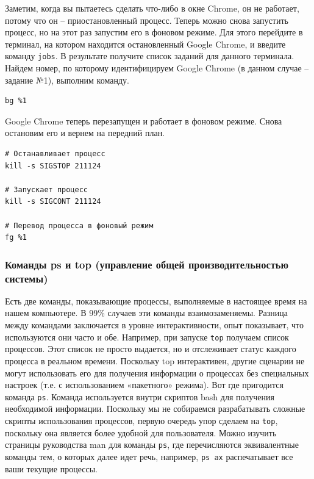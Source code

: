 \documentclass[12pt]{article}
\begin{document}
Заметим, когда вы пытаетесь сделать что-либо в окне Chrome, он не
работает, потому что он -- приостановленный процесс. Теперь можно снова
запустить процесс, но на этот раз запустим его в фоновом режиме. Для
этого перейдите в терминал, на котором находится остановленный Google
Chrome, и введите команду \texttt{jobs}. В результате получите список
заданий для данного терминала. Найдем номер, по которому идентифицируем
Google Chrome (в данном случае -- задание №1), выполним команду.

\begin{verbatim}
bg %1
\end{verbatim}

Google Chrome теперь перезапущен и работает в фоновом режиме. Снова
остановим его и вернем на передний план.

\begin{verbatim}
# Останавливает процесс
kill -s SIGSTOP 211124

# Запускает процесс
kill -s SIGCONT 211124

# Перевод процесса в фоновый режим
fg %1
\end{verbatim}

\hypertarget{ps-and-top-commands-system-performance-management}{%
\subsubsection{\texorpdfstring{\protect\hyperlink{ps-and-top-commands-system-performance-management}{}Команды
ps и top (управление общей производительностью
системы)}{Команды ps и top (управление общей производительностью системы)}}\label{ps-and-top-commands-system-performance-management}}

Есть две команды, показывающие процессы, выполняемые в настоящее время
на нашем компьютере. В 99\% случаев эти команды взаимозаменяемы. Разница
между командами заключается в уровне интерактивности, опыт показывает,
что используются они часто и обе. Например, при запуске \texttt{top}
получаем список процессов. Этот список не просто выдается, но и
отслеживает статус каждого процесса в реальном времени. Поскольку top
интерактивен, другие сценарии не могут использовать его для получения
информации о процессах без специальных настроек (т.е. с использованием
«пакетного» режима). Вот где пригодится команда \texttt{ps}. Команда
используется внутри скриптов bash для получения необходимой информации.
Поскольку мы не собираемся разрабатывать сложные скрипты использования
процессов, первую очередь упор сделаем на \texttt{top}, поскольку она
является более удобной для пользователя. Можно изучить страницы
руководства man для команды \texttt{ps}, где перечисляются эквивалентные
команды тем, о которых далее идет речь, например, \texttt{ps\ ax}
распечатывает все ваши текущие процессы.
\end{document}
